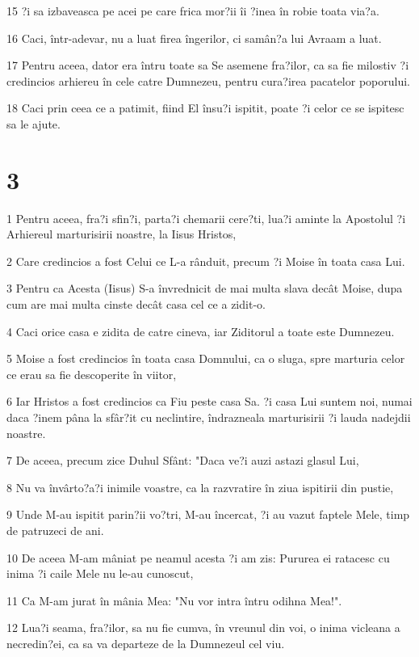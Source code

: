 \par 15 ?i sa izbaveasca pe acei pe care frica mor?ii îi ?inea în robie toata via?a.
\par 16 Caci, într-adevar, nu a luat firea îngerilor, ci samân?a lui Avraam a luat.
\par 17 Pentru aceea, dator era întru toate sa Se asemene fra?ilor, ca sa fie milostiv ?i credincios arhiereu în cele catre Dumnezeu, pentru cura?irea pacatelor poporului.
\par 18 Caci prin ceea ce a patimit, fiind El însu?i ispitit, poate ?i celor ce se ispitesc sa le ajute.

\chapter{3}

\par 1 Pentru aceea, fra?i sfin?i, parta?i chemarii cere?ti, lua?i aminte la Apostolul ?i Arhiereul marturisirii noastre, la Iisus Hristos,
\par 2 Care credincios a fost Celui ce L-a rânduit, precum ?i Moise în toata casa Lui.
\par 3 Pentru ca Acesta (Iisus) S-a învrednicit de mai multa slava decât Moise, dupa cum are mai multa cinste decât casa cel ce a zidit-o.
\par 4 Caci orice casa e zidita de catre cineva, iar Ziditorul a toate este Dumnezeu.
\par 5 Moise a fost credincios în toata casa Domnului, ca o sluga, spre marturia celor ce erau sa fie descoperite în viitor,
\par 6 Iar Hristos a fost credincios ca Fiu peste casa Sa. ?i casa Lui suntem noi, numai daca ?inem pâna la sfâr?it cu neclintire, îndrazneala marturisirii ?i lauda nadejdii noastre.
\par 7 De aceea, precum zice Duhul Sfânt: "Daca ve?i auzi astazi glasul Lui,
\par 8 Nu va învârto?a?i inimile voastre, ca la razvratire în ziua ispitirii din pustie,
\par 9 Unde M-au ispitit parin?ii vo?tri, M-au încercat, ?i au vazut faptele Mele, timp de patruzeci de ani.
\par 10 De aceea M-am mâniat pe neamul acesta ?i am zis: Pururea ei ratacesc cu inima ?i caile Mele nu le-au cunoscut,
\par 11 Ca M-am jurat în mânia Mea: "Nu vor intra întru odihna Mea!".
\par 12 Lua?i seama, fra?ilor, sa nu fie cumva, în vreunul din voi, o inima vicleana a necredin?ei, ca sa va departeze de la Dumnezeul cel viu.
